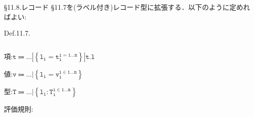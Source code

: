 \documentclass[9pt]{beamer}
\begin{document}
\begin{frame}{\S11.8.レコード}
\S11.7を(ラベル付き)レコード型に拡張する．以下のように定めればよい:
\begin{alertblock}{Def.11.7.}
    \begin{columns}
    \begin{column}{0.3\columnwidth}
        項:$\mathtt{t\Coloneq\ldots|\left\{l_{i} = t_{i}^{i = 1\ldots n}\right\}|t.l}$
        
        値:$\mathtt{v\Coloneq\ldots|\left\{l_{i} = v_{i}^{i\in 1\ldots n}\right\}}$

        型:$\mathtt{T\Coloneq\ldots|\left\{l_{i}:T_{i}^{i\in 1\ldots n}\right\}}$

        評価規則:
        \begin{prooftree}
        \end{prooftree}
    \end{column}
    \begin{column}{0.7\columnwidth}
        \begin{prooftree}
            \end{prooftree}
    \begin{prooftree}
    \end{prooftree}
    \begin{prooftree}
    \end{prooftree}
    \begin{prooftree}
    \end{prooftree}
    \end{column}
    \end{columns}
\end{alertblock}
\end{frame}
\end{document}
